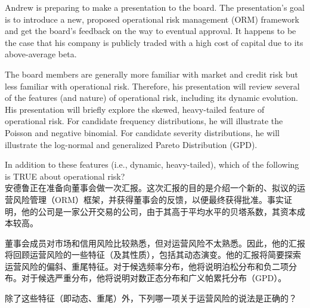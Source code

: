 \documentclass{article}
\newcounter{question} %
\begin{document}
  \begin{question}
      Andrew is preparing to make a presentation to the board. The presentation’s goal is to introduce a new, proposed operational risk management (ORM) framework and get the board’s feedback on the way to eventual approval. It happens to be the case that his company is publicly traded with a high cost of capital due to its above-average beta.
  
      The board members are generally more familiar with market and credit risk but less familiar with operational risk. Therefore, his presentation will review several of the features (and nature) of operational risk, including its dynamic evolution. His presentation will briefly explore the skewed, heavy-tailed feature of operational risk. For candidate frequency distributions, he will illustrate the Poisson and negative binomial. For candidate severity distributions, he will illustrate the log-normal and generalized Pareto Distribution (GPD).
  
      In addition to these features (i.e., dynamic, heavy-tailed), which of the following is TRUE about operational risk?\\
      安德鲁正在准备向董事会做一次汇报。这次汇报的目的是介绍一个新的、拟议的运营风险管理（ORM）框架，并获得董事会的反馈，以便最终获得批准。事实证明，他的公司是一家公开交易的公司，由于其高于平均水平的贝塔系数，其资本成本较高。

     董事会成员对市场和信用风险比较熟悉，但对运营风险不太熟悉。因此，他的汇报将回顾运营风险的一些特征（及其性质），包括其动态演变。他的汇报将简要探索运营风险的偏斜、重尾特征。对于候选频率分布，他将说明泊松分布和负二项分布。对于候选严重分布，他将说明对数正态分布和广义帕累托分布（GPD）。

     除了这些特征（即动态、重尾）外，下列哪一项关于运营风险的说法是正确的？
  \end{question}
  
\end{document}
